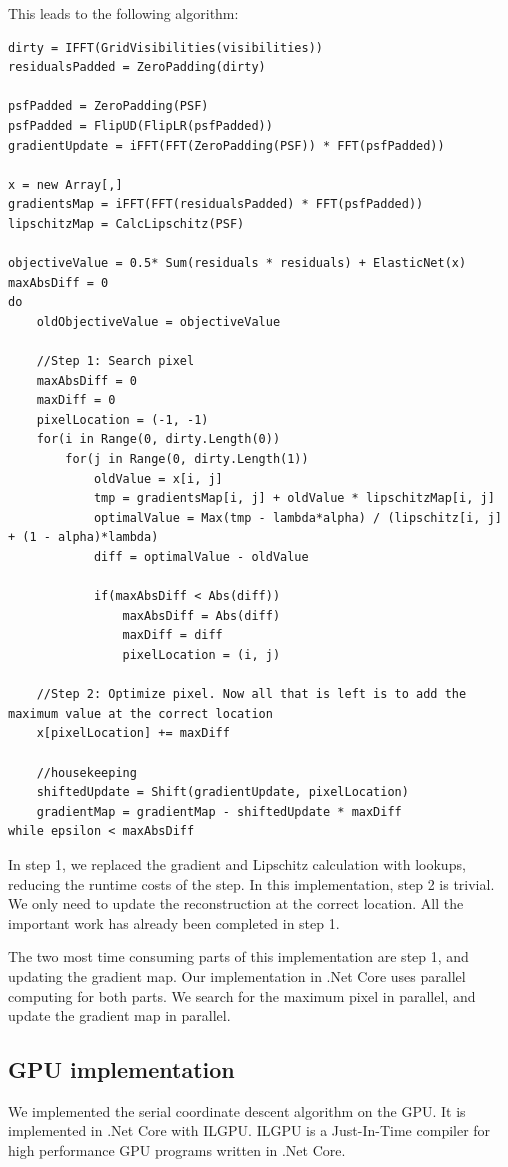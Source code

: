 This leads to the following algorithm:
\begin{lstlisting}
dirty = IFFT(GridVisibilities(visibilities))
residualsPadded = ZeroPadding(dirty)

psfPadded = ZeroPadding(PSF)
psfPadded = FlipUD(FlipLR(psfPadded))
gradientUpdate = iFFT(FFT(ZeroPadding(PSF)) * FFT(psfPadded))

x = new Array[,]
gradientsMap = iFFT(FFT(residualsPadded) * FFT(psfPadded))
lipschitzMap = CalcLipschitz(PSF)

objectiveValue = 0.5* Sum(residuals * residuals) + ElasticNet(x)
maxAbsDiff = 0
do 
	oldObjectiveValue = objectiveValue
	
	//Step 1: Search pixel
	maxAbsDiff = 0
	maxDiff = 0
	pixelLocation = (-1, -1)
	for(i in Range(0, dirty.Length(0))
		for(j in Range(0, dirty.Length(1))
			oldValue = x[i, j]
			tmp = gradientsMap[i, j] + oldValue * lipschitzMap[i, j]
			optimalValue = Max(tmp - lambda*alpha) / (lipschitz[i, j] + (1 - alpha)*lambda)
			diff = optimalValue - oldValue
			
			if(maxAbsDiff < Abs(diff))
				maxAbsDiff = Abs(diff)
				maxDiff = diff
				pixelLocation = (i, j)
	
	//Step 2: Optimize pixel. Now all that is left is to add the maximum value at the correct location
	x[pixelLocation] += maxDiff
	
	//housekeeping
	shiftedUpdate = Shift(gradientUpdate, pixelLocation)
	gradientMap = gradientMap - shiftedUpdate * maxDiff
while epsilon < maxAbsDiff
\end{lstlisting}

In step 1, we replaced the gradient and Lipschitz calculation with lookups, reducing the runtime costs of the step. In this implementation, step 2 is trivial. We only need to update the reconstruction at the correct location. All the important work has already been completed in step 1.

The two most time consuming parts of this implementation are step 1, and updating the gradient map. Our implementation in .Net Core uses parallel computing for both parts. We search for the maximum pixel in parallel, and update the gradient map in parallel.


\subsection{GPU implementation}
We implemented the serial coordinate descent algorithm on the GPU. It is implemented in .Net Core with ILGPU\cite{ilgpu}. ILGPU is a Just-In-Time compiler for high performance GPU programs written in .Net Core.

